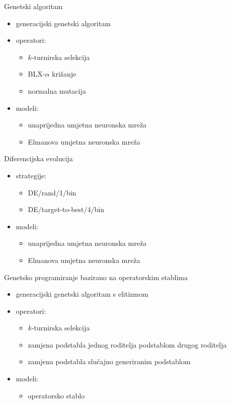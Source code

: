 \begin{frame}{Genetski algoritam}
	\begin{itemize}
		\item generacijski genetski algoritam
		\item operatori:
		\begin{itemize}
			\item $k$-turnirska selekcija
			\item BLX-$\alpha$ križanje
			\item normalna mutacija
		\end{itemize}
		\item modeli:
		\begin{itemize}
			\item unaprijedna umjetna neuronska mreža
			\item Elmanova umjetna neuronska mreža
		\end{itemize}
	\end{itemize}
\end{frame}

\begin{frame}{Diferencijska evolucija}
	\begin{itemize}
		\item strategije:
		\begin{itemize}
			\item DE/rand/1/bin
			\item DE/target-to-best/4/bin
		\end{itemize}
		\item modeli:
		\begin{itemize}
			\item unaprijedna umjetna neuronska mreža
			\item Elmanova umjetna neuronska mreža
		\end{itemize}
	\end{itemize}
\end{frame}

\begin{frame}{Genetsko programiranje bazirano na operatorskim stablima}
	\begin{itemize}
		\item generacijski genetski algoritam s elitizmom
		\item operatori:
		\begin{itemize}
			\item $k$-turnirska selekcija
			\item zamjena podstabla jednog roditelja podstablom drugog roditelja 
			\item zamjena podstabla slučajno generiranim podstablom
		\end{itemize}
		\item modeli:
		\begin{itemize}
			\item operatorsko stablo
		\end{itemize}
	\end{itemize}
\end{frame}

